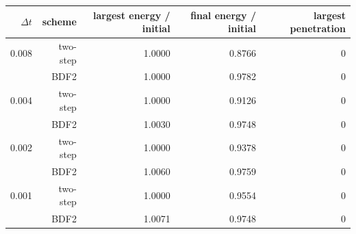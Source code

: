 \begin{tabular}{rrrrr}
\toprule
$\Delta t$ & scheme & largest energy / initial & final energy / initial & largest penetration \\
\midrule
0.008 & two-step & 1.0000 & 0.8766 & 0 \\
 & BDF2 & 1.0000 & 0.9782 & 0 \\
0.004 & two-step & 1.0000 & 0.9126 & 0 \\
 & BDF2 & 1.0030 & 0.9748 & 0 \\
0.002 & two-step & 1.0000 & 0.9378 & 0 \\
 & BDF2 & 1.0060 & 0.9759 & 0 \\
0.001 & two-step & 1.0000 & 0.9554 & 0 \\
 & BDF2 & 1.0071 & 0.9748 & 0 \\
\bottomrule
\end{tabular}
